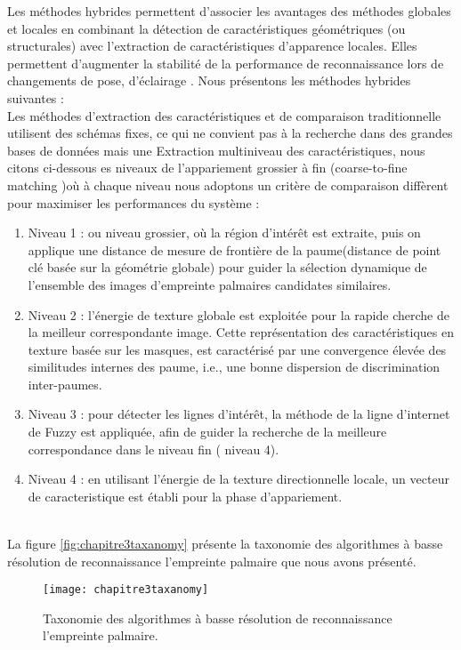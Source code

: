 {{ Les méthodes hybrides permettent d’associer les avantages des méthodes globales et locales en combinant la détection de caractéristiques géométriques (ou structurales) avec l’extraction de caractéristiques d’apparence locales. Elles permettent d’augmenter la stabilité de la performance de reconnaissance lors de changements de pose, d’éclairage \citep{meyer2009}. Nous présentons les méthodes hybrides suivantes :
 \\
 Les méthodes d’extraction des caractéristiques et de comparaison traditionnelle utilisent des schémas  fixes, ce qui ne convient pas à la recherche dans des grandes bases de données mais une 
Extraction multiniveau des caractéristiques, nous citons ci-dessous es niveaux de l’appariement grossier à fin (coarse-to-fine matching )où à  chaque niveau  nous adoptons un critère de comparaison diffèrent pour maximiser les performances du système \citep{zhang2004hierarchical,you2004hierarchical}:

\begin{enumerate}
	\item Niveau 1 : ou niveau grossier, où la région d’intérêt est extraite, puis on applique une distance de mesure de frontière de la paume(distance de point clé basée sur la géométrie globale) pour guider la sélection dynamique de l’ensemble des images d’empreinte palmaires candidates similaires.
	\item Niveau 2 : l’énergie de texture globale est exploitée pour la rapide cherche de la meilleur correspondante image. Cette représentation des caractéristiques en texture basée sur les  masques, est caractérisé par une convergence élevée des similitudes internes des paume, i.e., une bonne dispersion de discrimination inter-paumes.
	\item Niveau 3 : pour détecter les lignes d’intérêt, la méthode de la ligne d’internet de Fuzzy  est appliquée, afin de guider la recherche de la meilleure correspondance dans le niveau fin ( niveau 4).
	\item Niveau 4 : en utilisant l’énergie de la texture directionnelle locale, un vecteur de caracteristique est établi  pour la phase d’appariement.
	\end{enumerate}

  \\ La figure \ref{fig:chapitre3taxanomy} présente la taxonomie des algorithmes à basse résolution de reconnaissance l'empreinte palmaire que nous avons présenté.
 	\begin{center}
 	\begin{figure}[H]
 		\centering
 		\texttt{[image: chapitre3taxanomy]}
 		\captionsetup{justification=centering}
 		\caption{Taxonomie des algorithmes à basse résolution de reconnaissance l'empreinte palmaire.}
 		\label{fig:chapitre3taxo}
 	\end{figure}
 \end{center}
}}
